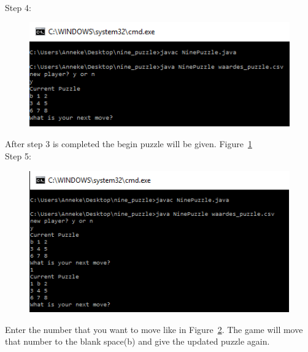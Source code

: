 \documentclass[10pt]{article}
\begin{document}
\\Step 4:
\begin{figure}
\centering
 \includegraphics[scale=0.8]{./Prente/prent2.png}
 \caption{}
 \label{prent2}
\end{figure}
After step 3 is completed the begin puzzle will be given. Figure~\ref{prent2}
\\Step 5:
\begin{figure}
\centering
 \includegraphics[scale=0.8]{./Prente/prent3.png}
 \caption{}
 \label{prent3}
\end{figure}
Enter the number that you want to move like in Figure~\ref{prent3}. The game will move that number to the blank space(b) and give the updated puzzle again.
\end{document}
